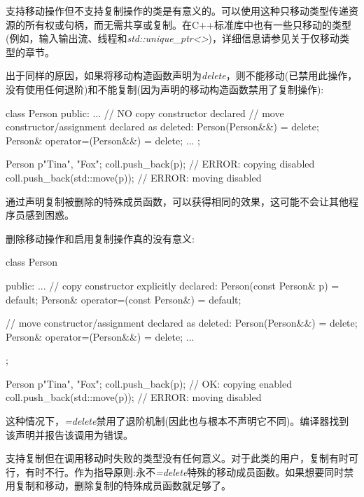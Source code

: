 支持移动操作但不支持复制操作的类是有意义的。可以使用这种只移动类型传递资源的所有权或句柄，而无需共享或复制。在C++标准库中也有一些只移动的类型(例如，输入输出流、线程和\textit{std::\allowbreak{}unique\_\allowbreak{}ptr<\allowbreak{}>})，详细信息请参见关于仅移动类型的章节。\par


出于同样的原因，如果将移动构造函数声明为\textit{delete}，则不能移动(已禁用此操作，没有使用任何退阶)和不能复制(因为声明的移动构造函数禁用了复制操作):\par

\begin{codebox}[cpp]
class Person {
public:
  ...
  // NO copy constructor declared
  // move constructor/assignment declared as deleted:
  Person(Person&&) = delete;
  Person& operator=(Person&&) = delete;
  ...
};

Person p{"Tina", "Fox"};
coll.push_back(p); // ERROR: copying disabled
coll.push_back(std::move(p)); // ERROR: moving disabled
\end{codebox}

通过声明复制被删除的特殊成员函数，可以获得相同的效果，这可能不会让其他程序员感到困惑。\par

删除移动操作和启用复制操作真的没有意义:\par

\begin{codebox}[cpp]
class Person {
  public:
  ...
  // copy constructor explicitly declared:
  Person(const Person& p) = default;
  Person& operator=(const Person&) = default;

  // move constructor/assignment declared as deleted:
  Person(Person&&) = delete;
  Person& operator=(Person&&) = delete;
  ...
};

Person p{"Tina", "Fox"};
coll.push_back(p); // OK: copying enabled
coll.push_back(std::move(p)); // ERROR: moving disabled
\end{codebox}

这种情况下，\textit{=delete}禁用了退阶机制(因此也与根本不声明它不同)。编译器找到该声明并报告该调用为错误。\par

支持复制但在调用移动时失败的类型没有任何意义。对于此类的用户，复制有时可行，有时不行。作为指导原则:永不\textit{=delete}特殊的移动成员函数。如果想要同时禁用复制和移动，删除复制的特殊成员函数就足够了。\par

